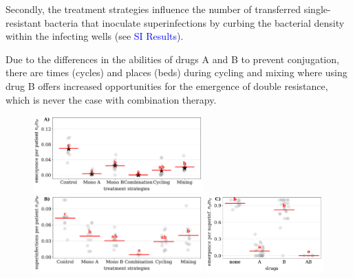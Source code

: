 \documentclass[9pt,twocolumn,twoside,lineno]{pnas-new}
\newcommand{\sisec}[1]{\textcolor{blue}{#1}}
\begin{document}
    Secondly, the treatment strategies influence the number of transferred single-resistant bacteria that inoculate superinfections by curbing the bacterial density within the infecting wells (see \sisec{SI Results}).
    
    Due to the differences in the abilities of drugs A and B to prevent conjugation, there are times (cycles) and places (beds) during cycling and mixing where using drug B offers increased opportunities for the emergence of double resistance, which is never the case with combination therapy.
    
    
    \begin{figure}[t]
        \newcommand{\imageheight}{2.95cm}
                \includegraphics[height = \imageheight]{20220412_f_emergence_anova.pdf}
            \includegraphics[height = \imageheight]{20220412_encounter_frequencies.pdf}
            \includegraphics[height = \imageheight]{20220412_conjugation_prop.pdf}
         

\end{figure}
\end{document}
